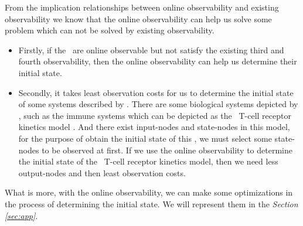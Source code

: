 From the implication relationships between online observability and existing observability we know that the online observability can help us solve some problem which can not be solved by existing observability. 
 \begin{itemize}
 \item Firstly, if the \BCNs\ are online observable but not satisfy the existing third and fourth observability, then the online observability can help us determine their initial state. 
 \item Secondly, it takes least observation costs for us to determine the initial state of some systems described by \BCNs. There are some biological systems depicted by \BCNs, such as the immune systems which can be depicted as the \BCN\ T-cell receptor kinetics model \cite{Klamt2006A}. And there exist input-nodes and state-nodes in this model, for the purpose of obtain the initial state of this \BCN, we must select some state-nodes to be observed at first. If we use the online observability to determine the initial state of the \BCN\ T-cell receptor kinetics model, then we need less output-nodes and then least observation costs. 
 \end{itemize}

What is more, with the online observability, we can make some optimizations in the process of determining the initial state. We will represent them in the {\em Section \ref{sec:app}}.
   
   
